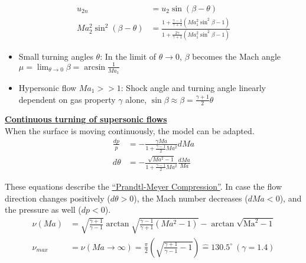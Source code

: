 \documentclass[8pt, landscape, fleqn]{scrartcl}
\begin{document}
\begin{multicols*}{3}
\begin{align*}
    u_{2n} &= u_2 \sin (\beta - \theta) \\
    Ma_2^2 \sin^2 (\beta - \theta) &= \frac{1 + \frac{\gamma - 1}{\gamma + 1} (Ma_1^2 \sin^2 \beta - 1)}{1 + \frac{2 \gamma}{\gamma + 1} (Ma_1^2 \sin^2 \beta -1)}
\end{align*}
\begin{itemize}
    \item Small turning angles $\theta$: In the limit of $\theta \rightarrow 0$, $\beta$ becomes the Mach angle $\mu = \lim_{\theta \rightarrow 0} \beta = \arcsin \frac{1}{Ma_1}$
    \item Hypersonic flow $Ma_1 >> 1$: Shock angle and turning angle linearly dependent on gas property $\gamma$ alone, $\sin \beta \approx \beta = \frac{\gamma + 1}{2} \theta$
\end{itemize}
\underline{\textbf{Continuous turning of supersonic flows}} \\
When the surface is moving continuously, the model can be adapted.
\begin{align*}
    \frac{dp}{p} &= - \frac{\gamma Ma}{1 + \frac{\gamma-1}{2}Ma^2} dMa \\
    d\theta &= - \frac{\sqrt{Ma^2-1}}{1 + \frac{\gamma-1}{2}Ma^2}\frac{dMa}{Ma}
\end{align*}

These equations describe the \underline{``Prandtl-Meyer Compression''}. In case the flow direction changes positively ($d\theta > 0$), the Mach number decreases ($dMa < 0$), and the pressure as well ($dp < 0$). 
\begin{align*}
\nu(Ma) &= \sqrt{\frac{\gamma + 1}{\gamma -1}} \arctan \sqrt{\frac{\gamma-1}{\gamma+1}(Ma^2-1)}-\arctan\sqrt{\text{Ma}^2-1}   \\
\nu_{max} &= \nu(Ma \rightarrow \infty) = \frac{\pi}{2}\left( \sqrt{\frac{\gamma+1}{\gamma-1}-1} \right) \hat{=} 130.5^{\circ} ~ (\gamma = 1.4)
\end{align*}


\end{multicols*}
\end{document}
